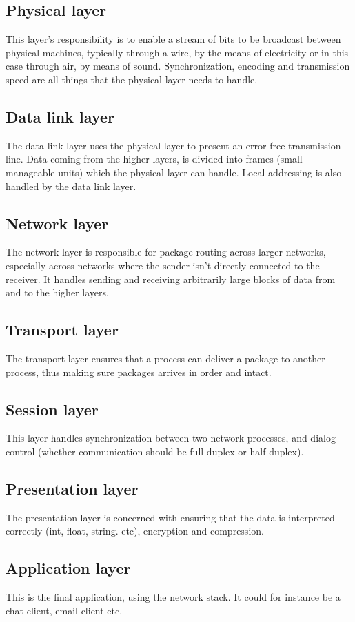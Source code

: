 \subsection{Physical layer}
This layer's responsibility is to enable a stream of bits to be broadcast between physical machines, typically through a wire, by the means of electricity or in this case through air, by means of sound. Synchronization, encoding and transmission speed are all things that the physical layer needs to handle.

\subsection{Data link layer}
The data link layer uses the physical layer to present an error free transmission line. Data coming from the higher layers, is divided into frames (small manageable units) which the physical layer can handle. Local addressing is also handled by the data link layer.

\subsection{Network layer}
The network layer is responsible for package routing across larger networks, especially across networks where the sender isn't directly connected to the receiver. It handles sending and receiving arbitrarily large blocks of data from and to the higher layers.

\subsection{Transport layer}
The transport layer ensures that a process can deliver a package to another process, thus making sure packages arrives in order and intact.

\subsection{Session layer}
This layer handles synchronization between two network processes, and dialog control (whe\-ther communication should be full duplex or half duplex).

\subsection{Presentation layer}
The presentation layer is concerned with ensuring that the data is interpreted correctly (int, float, string. etc), encryption and compression.

\subsection{Application layer}
This is the final application, using the network stack. It could for instance be a chat client, email client etc.
